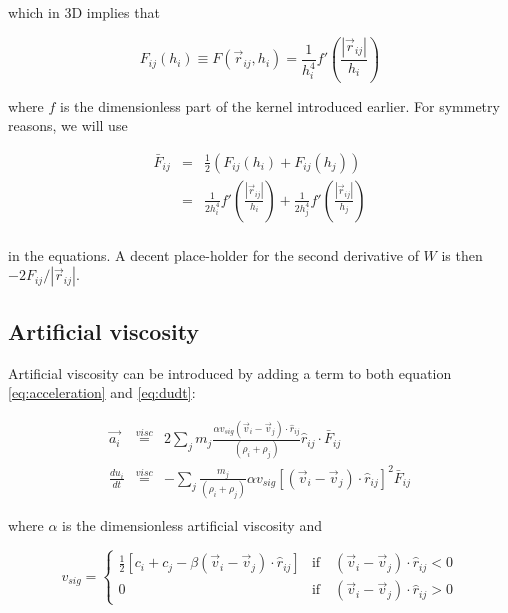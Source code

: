 \documentclass[a4paper,10pt]{report}
\begin{document}
which in 3D implies that

\begin{equation}
 F_{ij}(h_i) \equiv F(\vec{r}_{ij},h_i) = \frac{1}{h_i^4}f'\left(\frac{|\vec{r}_{ij}|}{h_i}\right)
\end{equation}

where $f$ is the dimensionless part of the kernel introduced earlier. For symmetry reasons, we will use

\begin{eqnarray}
 \bar{F}_{ij} &=& \frac{1}{2} \left(F_{ij}(h_i) + F_{ij}(h_j)\right) \\
	      &=& \frac{1}{2h_i^4}f'\left(\frac{|\vec{r}_{ij}|}{h_i}\right) +
\frac{1}{2h_j^4}f'\left(\frac{|\vec{r}_{ij}|}{h_j}\right) \\
\end{eqnarray}

in the equations. A decent place-holder for the second derivative of $W$ is then $-2F_{ij}/|\vec{r}_{ij}|$.

\subsection{Artificial viscosity}

 Artificial viscosity can be introduced by adding a term to both equation \ref{eq:acceleration} and \ref{eq:dudt}:

\begin{eqnarray}
  \vec{a_i} &\stackrel{visc}{=}& 2\sum_j m_j \frac{\alpha v_{sig}\left(\vec{v}_i -
\vec{v}_j\right)\cdot\hat{r}_{ij}}{\left(\rho_i + \rho_j\right)}\hat{r}_{ij}\cdot \bar{F}_{ij} \label{eq:visc}\\
 \frac{du_i}{dt} &\stackrel{visc}{=}& -\sum_j \frac{m_j}{(\rho_i + \rho_j)} \alpha
v_{sig}\left[\left(\vec{v}_i-\vec{v}_j\right)\cdot\hat{r}_{ij}\right]^2 \bar{F}_{ij}
\end{eqnarray}

where $\alpha$ is the dimensionless artificial viscosity and

\begin{equation}
 v_{sig} = \begin{cases}
	    \frac{1}{2}\left[c_i + c_j - \beta\left(\vec{v}_i-\vec{v}_j\right)\cdot\hat{r}_{ij} \right] &
\mbox{if} \quad \left(\vec{v}_i-\vec{v}_j\right)\cdot \hat{r}_{ij} < 0\\
            0 & \mbox{if} \quad \left(\vec{v}_i-\vec{v}_j\right)\cdot \hat{r}_{ij} > 0
            \end{cases}
\end{equation}
\end{document}
